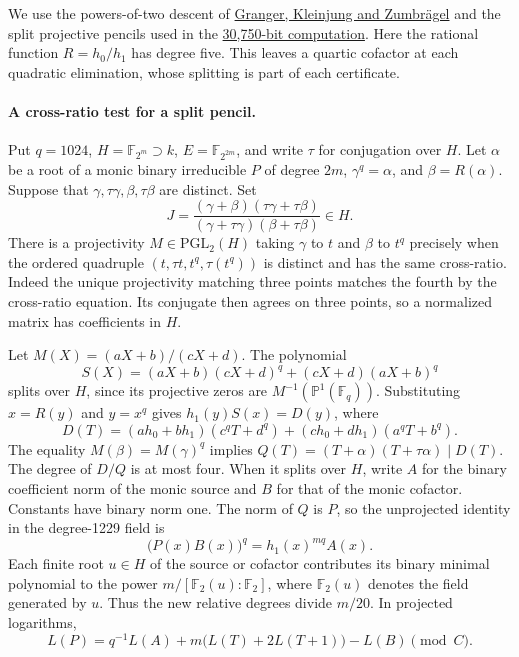 \documentclass[11pt]{article}
\newcommand{\F}{\mathbb F_2}
\begin{document}
We use the powers-of-two descent of
\href{https://arxiv.org/abs/1507.01495}{Granger, Kleinjung and Zumbr\"agel}
and the split projective pencils used in the
\href{https://arxiv.org/abs/2008.02717}{30,750-bit computation}.
Here the rational function \(R=h_0/h_1\) has degree five.
This leaves a quartic cofactor at each quadratic elimination, whose
splitting is part of each certificate.

\paragraph{A cross-ratio test for a split pencil.}
Put \(q=1024\), \(H=\mathbb F_{2^m}\supset k\), \(E=\mathbb F_{2^{2m}}\),
and write \(\tau\) for conjugation over \(H\). Let \(\alpha\) be a root
of a monic binary irreducible \(P\) of degree \(2m\),
\(\gamma^q=\alpha\), and \(\beta=R(\alpha)\). Suppose that
\(\gamma,\tau\gamma,\beta,\tau\beta\) are distinct. Set
\[
 J=\frac{(\gamma+\beta)(\tau\gamma+\tau\beta)}
            {(\gamma+\tau\gamma)(\beta+\tau\beta)}\in H .
\]
There is a projectivity \(M\in\mathrm{PGL}_2(H)\) taking \(\gamma\)
to \(t\) and \(\beta\) to \(t^q\) precisely when the ordered quadruple
\((t,\tau t,t^q,\tau(t^q))\) is distinct and has the same cross-ratio.
Indeed the unique projectivity matching three points matches the fourth
by the cross-ratio equation. Its conjugate then agrees on three points,
so a normalized matrix has coefficients in \(H\).

Let \(M(X)=(aX+b)/(cX+d)\). The polynomial
\[
 S(X)=(aX+b)(cX+d)^q+(cX+d)(aX+b)^q
\]
splits over \(H\), since its projective zeros are
\(M^{-1}(\mathbb P^1(\mathbb F_q))\). Substituting \(x=R(y)\)
and \(y=x^q\) gives \(h_1(y)S(x)=D(y)\), where
\[
 D(T)=(ah_0+bh_1)(c^qT+d^q)+(ch_0+dh_1)(a^qT+b^q).
\]
The equality \(M(\beta)=M(\gamma)^q\) implies
\(Q(T)=(T+\alpha)(T+\tau\alpha)\mid D(T)\).
The degree of \(D/Q\) is at most four. When it splits over \(H\),
write \(A\) for the binary coefficient norm of the monic source and
\(B\) for that of the monic cofactor. Constants have binary norm one.
The norm of \(Q\) is \(P\), so the unprojected identity in the
degree-1229 field is
\[
       \bigl(P(x)B(x)\bigr)^q=h_1(x)^{mq}A(x).
\]
Each finite root \(u\in H\) of the source or cofactor contributes
its binary minimal polynomial to the power \(m/[\F(u):\F]\),
where \(\F(u)\) denotes the field generated by \(u\).
Thus the new relative degrees divide \(m/20\). In projected logarithms,
\[
     L(P)=q^{-1}L(A)+m\bigl(L(T)+2L(T+1)\bigr)-L(B)\pmod C .
\]
\end{document}
